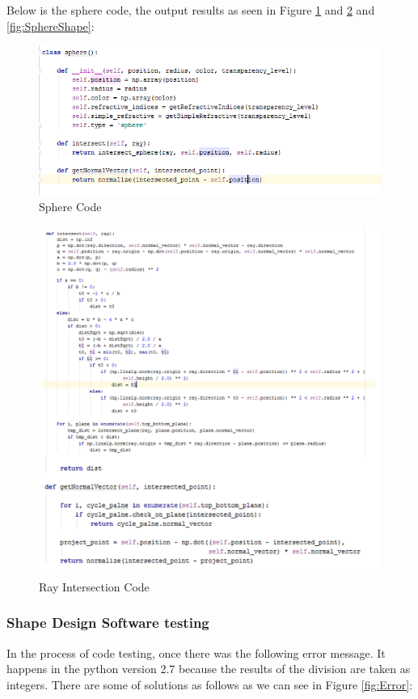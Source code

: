 \documentclass[a4paper, 12pt]{article}
\begin{document}
Below is the sphere code, the output results as seen in Figure \ref{fig:Sphere Code} and \ref{fig:RayIntersection} and \ref{fig:SphereShape}:

\begin{figure}[h]
\centering
\includegraphics[scale=0.6]{ShD_Sphere_code.png}
  \caption{Sphere Code}
  \label{fig:Sphere Code}
\end{figure}

\begin{figure}[ht]  
\centering
\includegraphics[scale=0.6]{ShD_ray_intersection_code.png}
    \caption{Ray Intersection Code}
    \label{fig:RayIntersection}
\end{figure}


\subsubsection{Shape Design Software testing}
In the process of code testing, once there was the following error message. It happens in the python version 2.7 because the results of the division are taken as integers. There are some of solutions as follows as we can see in Figure \ref{fig:Error}:
\end{document}
